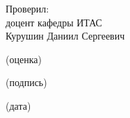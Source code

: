 \begin{titlepage}
\vspace{1em}

\begin{flushleft}
    \begin{minipage}{0.48\textwidth}
    Проверил:\\
    доцент кафедры ИТАС\\
    Курушин Даниил Сергеевич
    \vskip 1cm
    \begin{minipage}{0.48\textwidth}
        \centering\footnotesize
        \underline{\hspace{\textwidth}}
        (оценка)
    \end{minipage}
    \hfill
    \begin{minipage}{0.48\textwidth}
        \centering\footnotesize
        \underline{\hspace{\textwidth}}
        (подпись)
        \end{minipage}
        \vskip 1cm
        \hfill
        \begin{minipage}{0.48\textwidth}
            \centering\footnotesize
            \underline{\hspace{\textwidth}}
            (дата)
        \end{minipage}
    \end{minipage}
\end{flushleft}

\vspace{\fill}

\end{titlepage}